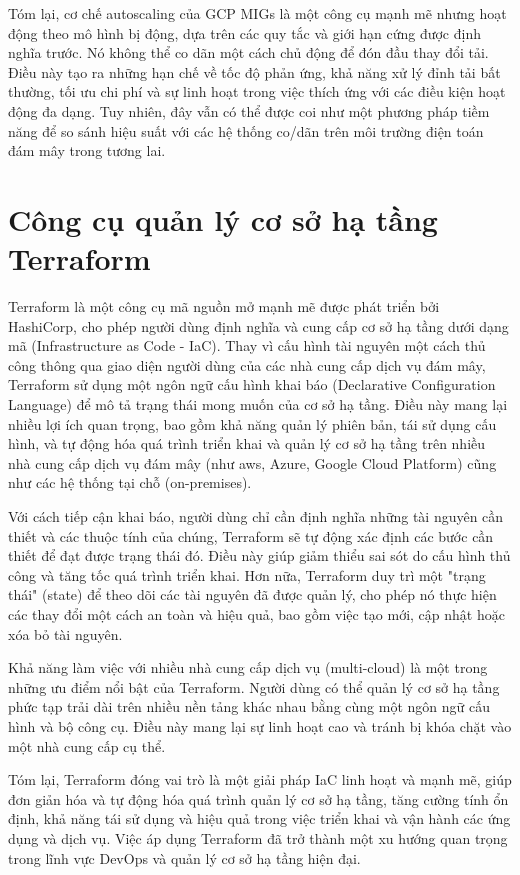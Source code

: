 Tóm lại, cơ chế autoscaling của GCP MIGs là một công cụ mạnh mẽ nhưng hoạt động theo mô hình bị động, dựa trên các quy tắc và giới hạn cứng được định nghĩa trước. Nó không thể co dãn một cách chủ động để đón đầu thay đổi tải. Điều này tạo ra những hạn chế về tốc độ phản ứng, khả năng xử lý đỉnh tải bất thường, tối ưu chi phí và sự linh hoạt trong việc thích ứng với các điều kiện hoạt động đa dạng. Tuy nhiên, đây vẫn có thể được coi như một phương pháp tiềm năng để so sánh hiệu suất với các hệ thống co/dãn trên môi trường điện toán đám mây trong tương lai.


\section{Công cụ quản lý cơ sở hạ tầng Terraform}

Terraform \autocite{terraform} là một công cụ mã nguồn mở mạnh mẽ được phát triển bởi HashiCorp, cho phép người dùng định nghĩa và cung cấp cơ sở hạ tầng dưới dạng mã (Infrastructure as Code - IaC). Thay vì cấu hình tài nguyên một cách thủ công thông qua giao diện người dùng của các nhà cung cấp dịch vụ đám mây, Terraform sử dụng một ngôn ngữ cấu hình khai báo (Declarative Configuration Language) để mô tả trạng thái mong muốn của cơ sở hạ tầng. Điều này mang lại nhiều lợi ích quan trọng, bao gồm khả năng quản lý phiên bản, tái sử dụng cấu hình, và tự động hóa quá trình triển khai và quản lý cơ sở hạ tầng trên nhiều nhà cung cấp dịch vụ đám mây (như \gls{aws}, Azure, Google Cloud Platform) cũng như các hệ thống tại chỗ (on-premises).

Với cách tiếp cận khai báo, người dùng chỉ cần định nghĩa những tài nguyên cần thiết và các thuộc tính của chúng, Terraform sẽ tự động xác định các bước cần thiết để đạt được trạng thái đó. Điều này giúp giảm thiểu sai sót do cấu hình thủ công và tăng tốc quá trình triển khai. Hơn nữa, Terraform duy trì một "trạng thái" (state) để theo dõi các tài nguyên đã được quản lý, cho phép nó thực hiện các thay đổi một cách an toàn và hiệu quả, bao gồm việc tạo mới, cập nhật hoặc xóa bỏ tài nguyên.

Khả năng làm việc với nhiều nhà cung cấp dịch vụ (multi-cloud) là một trong những ưu điểm nổi bật của Terraform. Người dùng có thể quản lý cơ sở hạ tầng phức tạp trải dài trên nhiều nền tảng khác nhau bằng cùng một ngôn ngữ cấu hình và bộ công cụ. Điều này mang lại sự linh hoạt cao và tránh bị khóa chặt vào một nhà cung cấp cụ thể.

Tóm lại, Terraform đóng vai trò là một giải pháp IaC linh hoạt và mạnh mẽ, giúp đơn giản hóa và tự động hóa quá trình quản lý cơ sở hạ tầng, tăng cường tính ổn định, khả năng tái sử dụng và hiệu quả trong việc triển khai và vận hành các ứng dụng và dịch vụ. Việc áp dụng Terraform đã trở thành một xu hướng quan trọng trong lĩnh vực DevOps và quản lý cơ sở hạ tầng hiện đại.

